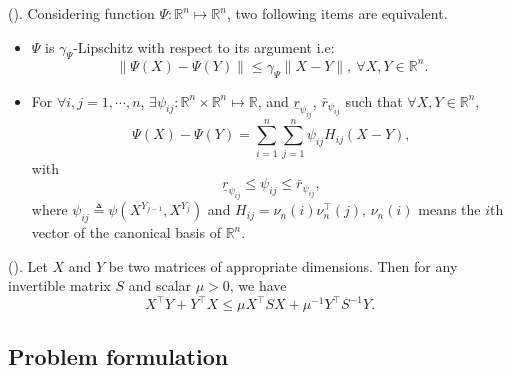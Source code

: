 \documentclass{ifacconf}
\begin{document}
            \begin{lemma}
                (\cite{zemouche2013lmi}).
                \label{lemma:zemouche_ineq}
               Considering function $\Psi:\mathbb{R}^n\mapsto\mathbb{R}^n$, two following items are equivalent.
                \begin{itemize}
                    \item $\Psi$ is $\gamma_\Psi$-Lipschitz with respect to its argument i.e:
                    \[\|\Psi(X)-\Psi(Y)\|\le\gamma_\Psi\|X-Y\|,\ \forall X,Y\in\mathbb{R}^n.\]
                    \item For $\forall i,j=1,\cdots,n$, $\exists \psi_{ij}:\mathbb{R}^n\times\mathbb{R}^n\mapsto \mathbb{R}$, and $\underline{r}_{\psi_{ij}}$, $\bar{r}_{\psi_{ij}}$ such that $\forall X,Y\in\mathbb{R}^n$,
                    \[\Psi(X)-\Psi(Y)=\sum^n_{i=1}\sum^n_{j=1}\psi_{ij}H_{ij}(X-Y),\]
                    with
                    \[ \underline{r}_{\psi_{ij}}\le\psi_{ij}\le\bar{r}_{\psi_{ij}},\]
                    where $\psi_{ij}\triangleq\psi(X^{Y_{j-1}},X^{Y_j})$ and $H_{ij}=\nu_n(i)\nu_n^\top(j)$, $\nu_n(i)$ means the $i$th vector of the canonical basis of $\mathbb{R}^n$.
                \end{itemize}
            \end{lemma}
            
            \begin{lemma}
                (\cite{nguyen2016observer}).
                \label{lemma:young_ineq}
                Let $X$ and $Y$ be two matrices of appropriate dimensions. Then for any invertible matrix $S$ and scalar $\mu>0$, we have
                \[X^\top Y+Y^\top X\le \mu X^\top SX+\mu^{-1}Y^\top S^{-1}Y.\]
            \end{lemma}
    \fi

\subsection{Problem formulation}
\vspace*{-0.3 cm}
\end{document}
